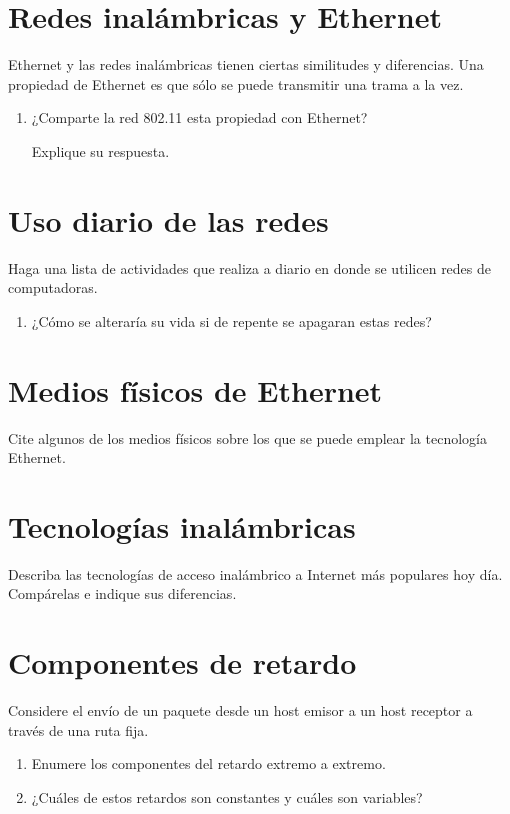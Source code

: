 \documentclass[12pt]{report}
\begin{document}

\section{Redes inalámbricas y Ethernet \sone}
Ethernet y las redes inalámbricas tienen ciertas similitudes y diferencias. Una propiedad de Ethernet es que sólo se puede transmitir una trama a la vez.
\begin{enumerate}
\item ¿Comparte la red 802.11 esta propiedad con Ethernet?

Explique su respuesta.
\end{enumerate}

\section{Uso diario de las redes \sone}
Haga una lista de actividades que realiza a diario en donde se utilicen redes de computadoras. 
\begin{enumerate}
\item ¿Cómo se alteraría su vida si de repente se apagaran estas redes?
\end{enumerate}

\section{Medios físicos de Ethernet \sone}
Cite algunos de los medios físicos sobre los que se puede emplear la tecnología Ethernet.

\section{Tecnologías inalámbricas \sone}
Describa las tecnologías de acceso inalámbrico a Internet más populares hoy día. Compárelas e indique sus diferencias.

\section{Componentes de retardo \stwo}
Considere el envío de un paquete desde un host emisor a un host receptor a través de una ruta fija.

\begin{enumerate}
\item Enumere los componentes del retardo extremo a extremo.
\item ¿Cuáles de estos retardos son constantes y cuáles son variables?
\end{enumerate}
\end{document}
